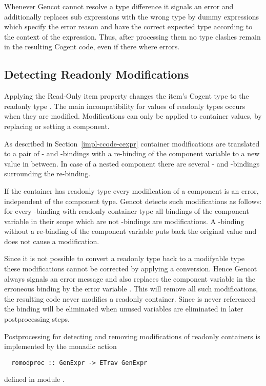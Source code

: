 Whenever Gencot cannot resolve a type difference it signals an error and additionally replaces sub expressions with the wrong type
by dummy expressions which specify the error reason and have the correct expected type according to the context of the expression.
Thus, after processing them no type clashes remain in the resulting Cogent code, even if there where errors.

\subsection{Detecting Readonly Modifications}
\label{impl-post-romod}

Applying the Read-Only item property changes the item's Cogent type  to the readonly type . The main incompatibility
for values of readonly types occurs when they are modified. Modifications can only be applied to container values, by replacing
or setting a component.

As described in Section~\ref{impl-ccode-cexpr} container modifications are translated to a pair of - and -bindings
with a re-binding of the component variable to a new value in between. In case of a nested component there are several -
and -bindings surrounding the re-binding.

If the container has readonly type every modification of a component is an error, independent of the component type. Gencot detects
such modifications as follows: for every -binding with readonly container type all bindings of the component
variable in their scope which are not -bindings are modifications. A -binding without a re-binding of the
component variable puts back the original value and does not cause a modification.

Since it is not possible to convert a readonly type back to a modifyable type these modifications cannot be corrected by
applying a conversion. Hence Gencot always signals an error message and also replaces the component variable in the erroneous
binding by the error variable . This will remove all such modifications, the resulting code never modifies a
readonly container. Since  is never referenced the binding will be eliminated when unused variables are eliminated
in later postprocessing steps.

Postprocessing for detecting and removing modifications of readonly containers is implemented by the monadic action
\begin{verbatim}
  romodproc :: GenExpr -> ETrav GenExpr
\end{verbatim}
defined in module .


